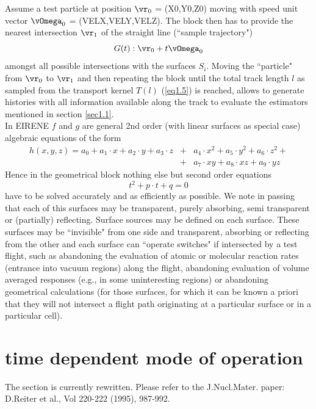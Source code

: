 Assume a test particle at position $ \vr_0 $ =
(X0,Y0,Z0) moving with speed unit vector $ \vOmega_0 $
= (VELX,VELY,VELZ). The block then has to provide the nearest
intersection $ \vr_1$ of the straight line (``sample trajectory")
\begin{equation}\nonumber
G(t):
 \vr_0   +   t   \vOmega_0
\end{equation}
amongst all possible intersections with the surfaces $S_i$. Moving
the ``particle" from $\vr_0$ to $\vr_1$ and
then repeating the block until the total track length $l$ as
sampled from the transport kernel $T(l)$ (\ref{eq1.5}) is reached,
allows to generate histories with all information available along
the track to evaluate the estimators mentioned in section
\ref{sec1.1}.
\\
In EIRENE $f$ and $g$ are general 2nd order (with linear surfaces
as special case) algebraic equations of the form
\begin{eqnarray}
h(x,y,z)   =   a_0   +   a_1  \cdot  x   + a_2   \cdot  y   +
a_3  \cdot  z  & + & a_4  \cdot  x^2   +   a_5  \cdot  y^2   +
a_6  \cdot  z^2   +  \nonumber\\
& + &  a_7  \cdot  xy   +   a_8  \cdot  xz   +
a_9  \cdot  yz \label{eq1.36}
\end{eqnarray}
Hence in the geometrical block nothing else but second order
equations
\begin{equation}\nonumber
t^2   +   p \cdot  t   +   q   =   0
\end{equation}
have to be solved
accurately and as efficiently as possible. We note in passing that
each of this surfaces may be transparent, purely absorbing, semi
transparent or (partially) reflecting. Surface sources may be
defined on each surface. These surfaces may be ``invisible" from
one side and transparent, absorbing or reflecting from the other
and each surface can ``operate switches" if intersected by a test
flight, such as abandoning the evaluation of atomic or molecular
reaction rates (entrance into vacuum regions) along the flight,
abandoning evaluation of volume averaged responses (e.g., in some
uninteresting regions) or abandoning geometrical calculations (for
those surfaces, for which it can be known a priori that they will
not intersect a flight path originating at a particular surface or
in a particular cell).

\newpage
\section{time dependent mode of operation} \label{sec1.6}
The section is currently rewritten. Please refer to the
J.Nucl.Mater. paper: D.Reiter et al., Vol 220-222 (1995), 987-992.

